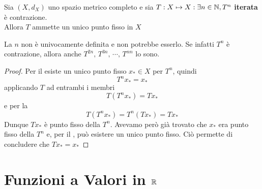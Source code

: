\begin{theorem}
	\label{teo:iterata_contraz}
	Sia $(X,d_X)$ uno spazio metrico completo e sia $T:X\mapsto X : \exists n \in \mathbb{N}, T^n$ \textbf{iterata} è contrazione.\\
	Allora $T$ ammette un unico punto fisso in $X$
	\begin{note}
		La $n$ non è univocamente definita e non potrebbe esserlo. Se infatti $T^n$ è contrazione, allora anche $T^{2n},\, T^{3n},\, \cdots,\, T^{\alpha n}$ lo sono.
	\end{note}
	\begin{proof}
		Per il  esiste un unico punto fisso $x_* \in X$ per $T^n$, quindi
		$$T^nx_* = x_*$$
		applicando $T$ ad entrambi i membri
		$$T(T^{n}x_*) = Tx_*$$
		e per la 
		$$T(T^{n}x_*) = T^n(Tx_*) = Tx_*$$
		Dunque $Tx_*$ è punto fisso della $T^n$. Avevamo però già trovato che $x_*$ era punto fisso della $T^n$ e, per il , può esistere un unico punto fisso. Ciò permette di concludere che $Tx_* = x_*$
	\end{proof}
\end{theorem}

\section{Funzioni a Valori in $\protect\mathbb{R}$}
